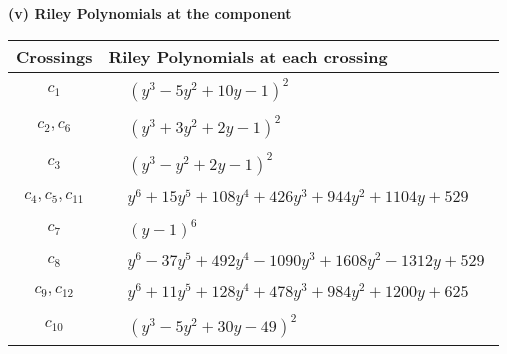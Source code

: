 \documentclass[1p]{elsarticle_modified}
\theoremstyle{definition}
\begin{document}
\newpage\renewcommand{\arraystretch}{1}
\flushleft \textbf{(v) Riley Polynomials at the component}\newline \\
\begin{tabular}{m{50pt}|m{274pt}}
Crossings & \hspace{64pt}Riley Polynomials at each crossing \\
\hline $$\begin{aligned}c_{1}\end{aligned}$$&$\begin{aligned}
&(y^3-5 y^2+10 y-1)^2
\end{aligned}$\\
\hline $$\begin{aligned}c_{2},c_{6}\end{aligned}$$&$\begin{aligned}
&(y^3+3 y^2+2 y-1)^2
\end{aligned}$\\
\hline $$\begin{aligned}c_{3}\end{aligned}$$&$\begin{aligned}
&(y^3- y^2+2 y-1)^2
\end{aligned}$\\
\hline $$\begin{aligned}c_{4},c_{5},c_{11}\end{aligned}$$&$\begin{aligned}
&y^6+15 y^5+108 y^4+426 y^3+944 y^2+1104 y+529
\end{aligned}$\\
\hline $$\begin{aligned}c_{7}\end{aligned}$$&$\begin{aligned}
&(y-1)^6
\end{aligned}$\\
\hline $$\begin{aligned}c_{8}\end{aligned}$$&$\begin{aligned}
&y^6-37 y^5+492 y^4-1090 y^3+1608 y^2-1312 y+529
\end{aligned}$\\
\hline $$\begin{aligned}c_{9},c_{12}\end{aligned}$$&$\begin{aligned}
&y^6+11 y^5+128 y^4+478 y^3+984 y^2+1200 y+625
\end{aligned}$\\
\hline $$\begin{aligned}c_{10}\end{aligned}$$&$\begin{aligned}
&(y^3-5 y^2+30 y-49)^2
\end{aligned}$\\
\hline
\end{tabular}\\~\\
\end{document}
